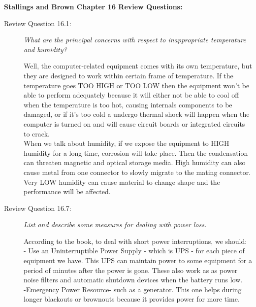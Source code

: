 \documentclass[12pt]{article}
\begin{document}
\vspace{2em}\hspace{-2em}
{\Large \textbf{Stallings and Brown Chapter 16 Review Questions:}} \par

\begin{description}

\item[Review Question 16.1:] {\color{grey}\textit{What are the principal concerns with respect to inappropriate temperature and humidity?}} \par
Well, the computer-related equipment comes with its own temperature, but they are designed to work within certain frame of temperature. If the temperature goes TOO HIGH or TOO LOW then the equipment won't be able to perform adequately because it will either not be able to cool off when the temperature is too hot, causing internals components to be damaged, or if it's too cold a undergo thermal shock will happen when the computer is turned on and will cause circuit boards or integrated circuits to crack. \\When we talk about humidity, if we expose the equipment to HIGH humidity for a long time, corrosion will take place. Then the condensation can threaten magnetic and optical storage media. High humidity can also cause metal from one connector to slowly migrate to the mating connector. Very LOW humidity  can cause material to change shape and the performance will be affected. 

\item[Review Question 16.7:] {\color{grey}\textit{List and describe some measures for dealing with power loss.}} \par
According to the book, to deal with short power interruptions, we should: \\
- Use an Uninterruptible Power Supply - which is UPS - for each piece of equipment we have. This UPS can maintain power to some equipment for a period of minutes after the power is gone. These also work as as power noise filters and automatic shutdown devices when the battery runs low. \\
-Emergency Power Resource-  such as a generator. This one helps during longer blackouts or brownouts because it provides power for more time.


\end{description}
\end{document}
